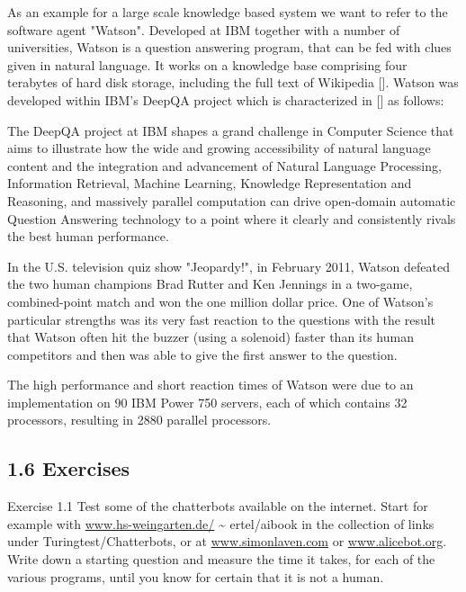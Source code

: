 \documentclass[10pt]{article}
\begin{document}
As an example for a large scale knowledge based system we want to refer to the software agent "Watson". Developed at IBM together with a number of universities, Watson is a question answering program, that can be fed with clues given in natural language. It works on a knowledge base comprising four terabytes of hard disk storage, including the full text of Wikipedia [\cite{ferrucci2009towards}]. Watson was developed within IBM's DeepQA project which is characterized in [\cite{deepqa2011project}] as follows:

\begin{displayquote}
The DeepQA project at IBM shapes a grand challenge in Computer Science that aims to illustrate how the wide and growing accessibility of natural language content and the integration and advancement of Natural Language Processing, Information Retrieval, Machine Learning, Knowledge Representation and Reasoning, and massively parallel computation can drive open-domain automatic Question Answering technology to a point where it clearly and consistently rivals the best human performance.
\end{displayquote}

In the U.S. television quiz show "Jeopardy!", in February 2011, Watson defeated the two human champions Brad Rutter and Ken Jennings in a two-game, combined-point match and won the one million dollar price. One of Watson's particular strengths was its very fast reaction to the questions with the result that Watson often hit the buzzer (using a solenoid) faster than its human competitors and then was able to give the first answer to the question.

The high performance and short reaction times of Watson were due to an implementation on 90 IBM Power 750 servers, each of which contains 32 processors, resulting in 2880 parallel processors.

\subsection*{1.6 Exercises}
Exercise 1.1 Test some of the chatterbots available on the internet. Start for example with \href{http://www.hs-weingarten.de/}{www.hs-weingarten.de/} \~{} ertel/aibook in the collection of links under Turingtest/Chatterbots, or at \href{http://www.simonlaven.com}{www.simonlaven.com} or \href{http://www.alicebot.org}{www.alicebot.org}. Write down a starting question and measure the time it takes, for each of the various programs, until you know for certain that it is not a human.
\end{document}
